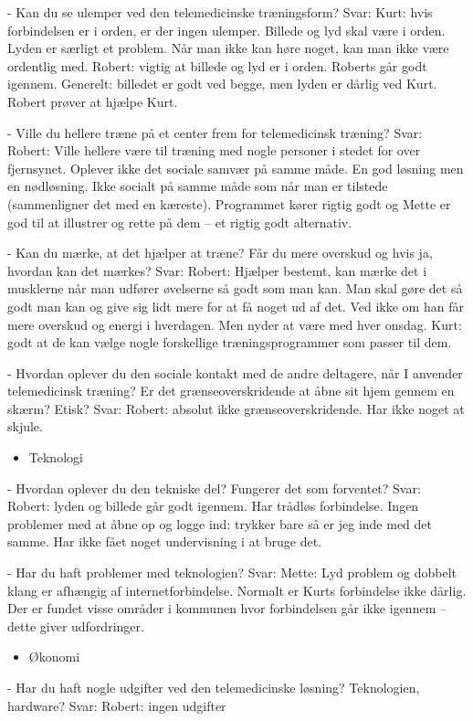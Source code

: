 -	Kan du se ulemper ved den telemedicinske træningsform?
Svar:
Kurt: hvis forbindelsen er i orden, er der ingen ulemper. Billede og lyd skal være i orden. Lyden er særligt et problem. Når man ikke kan høre noget, kan man ikke være ordentlig med. Robert: vigtig at billede og lyd er i orden. Roberts går godt igennem. Generelt: billedet er godt ved begge, men lyden er dårlig ved Kurt. Robert prøver at hjælpe Kurt.

-	Ville du hellere træne på et center frem for telemedicinsk træning?
Svar:
Robert: Ville hellere være til træning med nogle personer i stedet for over fjernsynet. Oplever ikke det sociale samvær på samme måde. En god løsning men en nødløsning. Ikke socialt på samme måde som når man er tilstede (sammenligner det med en kæreste). Programmet kører rigtig godt og Mette er god til at illustrer og rette på dem – et rigtig godt alternativ.

-	Kan du mærke, at det hjælper at træne? Får du mere overskud og hvis ja, hvordan
kan det mærkes?
Svar:
Robert: Hjælper bestemt, kan mærke det i musklerne når man udfører øvelserne så godt som man kan. Man skal gøre det så godt man kan og give sig lidt mere for at få noget ud af det. Ved ikke om han får mere overskud og energi i hverdagen. Men nyder at være med hver onsdag.
Kurt: godt at de kan vælge nogle forskellige træningsprogrammer som passer til dem.

-	Hvordan oplever du den sociale kontakt med de andre deltagere, når I anvender telemedicinsk
træning? Er det grænseoverskridende at åbne sit hjem gennem en skærm?
Etisk?
Svar:
Robert: absolut ikke grænseoverskridende. Har ikke noget at skjule.

\begin{itemize}
	\item Teknologi
\end{itemize}
-	Hvordan oplever du den tekniske del? Fungerer det som forventet?
Svar:
Robert: lyden og billede går godt igennem. Har trådløs forbindelse. Ingen problemer med at åbne op og logge ind: trykker bare så er jeg inde med det samme. Har ikke fået noget undervisning i at bruge det.

-	Har du haft problemer med teknologien?
Svar:
Mette: Lyd problem og dobbelt klang er afhængig af internetforbindelse. Normalt er Kurts forbindelse ikke dårlig. Der er fundet visse områder i kommunen hvor forbindelsen går ikke igennem – dette giver udfordringer.

\newpage
\begin{itemize}
	\item Økonomi
\end{itemize}
-	Har du haft nogle udgifter ved den telemedicinske løsning? Teknologien, hardware?
Svar:
Robert: ingen udgifter


